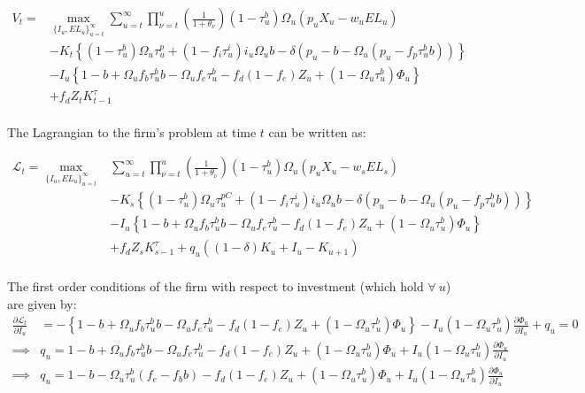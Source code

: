  \begin{equation}
\label{eqn:firm_seq_prob}
\begin{split}
V_{t} = &   \max_{\{I_{u},EL_{u}\}^{\infty}_{u=t}}   \sum_{u=t}^{\infty} \prod_{\nu=t}^{u}\left(\frac{1}{1+\theta_{\nu}}\right) (1-\tau^{b}_{u})\Omega_{u}(p_{u}X_{u}-w_{u}EL_{u})  \\ 
 & - K_{t} \left\{(1-\tau^{b}_{u})\Omega_{u}\tau^{p}_{u}+(1-f_{i}\tau^{i}_{u})i_{u}\Omega_{u}b-\delta(p_{u}-b-\Omega_{u}(p_{u}-f_{p}\tau^{b}_{u}b))\right\}  \\
 & - I_{u}\left\{1-b+\Omega_{u}f_{b}\tau^{b}_{u}b-\Omega_{u}f_{e}\tau^{b}_{u} - f_{d}(1-f_{e})Z_{u} + (1-\Omega_{u}\tau^{b}_{u})\Phi_{u}\right\} \\
 &  + f_{d}Z_{t}K^{\tau}_{t-1} \\
\end{split}
\end{equation}

The Lagrangian to the firm's problem at time $t$ can be written as:

 \begin{equation}
\label{eqn:lagrangian}
\begin{split}
\mathcal{L}_{t} = \max_{\{I_{u},EL_{u}\}^{\infty}_{u=t}} &  \sum_{u=t}^{\infty} \prod_{\nu=t}^{u}\left(\frac{1}{1+\theta_{\nu}}\right) (1-\tau^{b}_{u})\Omega_{u}(p_{u}X_{u}-w_{s}EL_{s})  \\ 
 & - K_{s} \left\{(1-\tau^{b}_{u})\Omega_{u}\tau^{pC}_{u}+(1-f_{i}\tau^{i}_{u})i_{u}\Omega_{u}b-\delta(p_{u}-b-\Omega_{u}(p_{u}-f_{p}\tau^{b}_{u}b))\right\}  \\
 & - I_{u}\left\{1-b+\Omega_{u}f_{b}\tau^{b}_{u}b-\Omega_{u}f_{e}\tau^{b}_{u} - f_{d}(1-f_{e})Z_{u} + (1-\Omega_{u}\tau^{b}_{u})\Phi_{u}\right\} \\
 &  + f_{d}Z_{s}K^{\tau}_{s-1} + q_{u}((1-\delta)K_{u} + I_{u}-K_{u+1})\\
\end{split}
\end{equation}

The first order conditions of the firm with respect to investment (which hold $\forall \ u$) are given by:
 \begin{equation}
\label{eqn:foc_i}
\begin{split}
\frac{\partial \mathcal{L}_{t}}{\partial I_{u}} & = -\left\{1-b+\Omega_{u}f_{b}\tau^{b}_{u}b-\Omega_{u}f_{e}\tau^{b}_{u} - f_{d}(1-f_{e})Z_{u} + (1-\Omega_{u}\tau^{b}_{u})\Phi_{u}\right\} - I_{u}(1-\Omega_{u}\tau^{b}_{u})\frac{\partial \Phi_{u}}{\partial I_{u}} + q_{u} = 0 \\
\implies & q_{u}  = 1-b+\Omega_{u}f_{b}\tau^{b}_{u}b-\Omega_{u}f_{e}\tau^{b}_{u} - f_{d}(1-f_{e})Z_{u} + (1-\Omega_{u}\tau^{b}_{u})\Phi_{u} +  I_{u}(1-\Omega_{u}\tau^{b}_{u})\frac{\partial \Phi_{u}}{\partial I_{u}} \\
\implies & q_{u}  = 1-b-\Omega_{u}\tau^{b}_{u}(f_{e}-f_{b}b) - f_{d}(1-f_{e})Z_{u} + (1-\Omega_{u}\tau^{b}_{u})\Phi_{u} +  I_{u}(1-\Omega_{u}\tau^{b}_{u})\frac{\partial \Phi_{u}}{\partial I_{u}} 
\end{split}
\end{equation}

